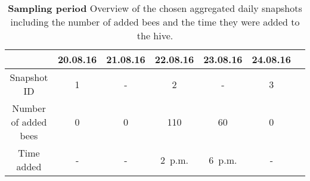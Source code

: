\begin{table}[htb]
\small
\centering
\caption[Sampling period]{\textbf{Sampling period} Overview of the chosen aggregated daily snapshots including the number of added bees and the time they were added to the hive.}
\vspace*{5mm}
\begin{tabularx}{\textwidth}{ccccccc}
\toprule
{} & 20.08.16 & 21.08.16 & 22.08.16 & 23.08.16 & 24.08.16 \\
\midrule
Snapshot ID & 1 & - & 2 & - & 3 & \\
Number of added bees & 0 & 0 & 110 & 60 & 0 \\
Time added & - & - & 2~p.m. & 6~p.m. & - \\
\bottomrule
\end{tabularx}
\label{tab:networks}
\end{table}